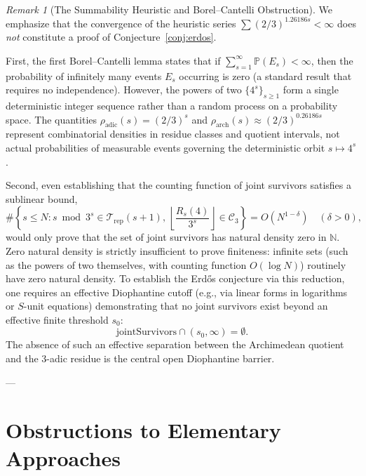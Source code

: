 \documentclass[11pt,reqno]{amsart}
\theoremstyle{plain}
\theoremstyle{definition}
\theoremstyle{remark}
\newtheorem{remark}[theorem]{Remark}
\newcommand{\C}{\mathcal{C}}
\newcommand{\N}{\mathbb{N}}
\newcommand{\Trep}{\mathcal{T}_{\mathrm{rep}}}
\begin{document}
\begin{remark}[The Summability Heuristic and Borel--Cantelli Obstruction]\label{rem:borel_cantelli}
We emphasize that the convergence of the heuristic series $\sum (2/3)^{1.26186 s} < \infty$ does \emph{not} constitute a proof of Conjecture~\ref{conj:erdos}.

First, the first Borel--Cantelli lemma states that if $\sum_{s=1}^\infty \mathbb{P}(E_s) < \infty$, then the probability of infinitely many events $E_s$ occurring is zero (a standard result that requires no independence). However, the powers of two $\{4^s\}_{s \ge 1}$ form a single deterministic integer sequence rather than a random process on a probability space. The quantities $\rho_{\mathrm{adic}}(s) = (2/3)^s$ and $\rho_{\mathrm{arch}}(s) \approx (2/3)^{0.26186 s}$ represent combinatorial densities in residue classes and quotient intervals, not actual probabilities of measurable events governing the deterministic orbit $s \mapsto 4^s$.

Second, even establishing that the counting function of joint survivors satisfies a sublinear bound,
\begin{equation}
\# \left\{ s \le N : s \bmod 3^s \in \Trep(s+1), \, \left\lfloor \frac{R_s(4)}{3^s} \right\rfloor \in \C_3 \right\} = O(N^{1 - \delta}) \quad (\delta > 0),
\end{equation}
would only prove that the set of joint survivors has natural density zero in $\N$. Zero natural density is strictly insufficient to prove finiteness: infinite sets (such as the powers of two themselves, with counting function $O(\log N)$) routinely have zero natural density. To establish the Erd\H{o}s conjecture via this reduction, one requires an effective Diophantine cutoff (e.g., via linear forms in logarithms or $S$-unit equations) demonstrating that no joint survivors exist beyond an effective finite threshold $s_0$:
\begin{equation}
\mathrm{jointSurvivors} \cap (s_0, \infty) = \emptyset.
\end{equation}
The absence of such an effective separation between the Archimedean quotient and the $3$-adic residue is the central open Diophantine barrier.
\end{remark}

---

\section{Obstructions to Elementary Approaches}\label{sec:obstructions}
\end{document}
